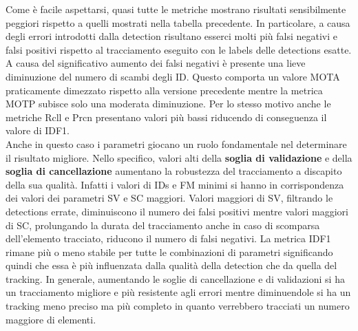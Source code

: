 Come è facile aspettarsi, quasi tutte le metriche mostrano risultati sensibilmente peggiori rispetto a quelli mostrati nella tabella precedente. In particolare, a causa degli errori introdotti dalla detection risultano esserci molti più falsi negativi e falsi positivi rispetto al tracciamento eseguito con le labels delle detections esatte. A causa del significativo aumento dei falsi negativi è presente una lieve diminuzione del numero di scambi degli ID. Questo comporta un valore MOTA praticamente dimezzato rispetto alla versione precedente mentre la metrica MOTP subisce solo una moderata diminuzione. Per lo stesso motivo anche le metriche Rcll e Prcn presentano valori più bassi riducendo di conseguenza il valore di IDF1.\\
Anche in questo caso i parametri giocano un ruolo fondamentale nel determinare il risultato migliore. Nello specifico, valori alti della \textbf{soglia di validazione} e della \textbf{soglia di cancellazione} aumentano la robustezza del tracciamento a discapito della sua qualità. Infatti i valori di IDs e FM minimi si hanno in corrispondenza dei valori dei parametri SV e SC maggiori. Valori maggiori di SV, filtrando le detections errate, diminuiscono il numero dei falsi positivi mentre valori maggiori di SC, prolungando la durata del tracciamento anche in caso di scomparsa dell'elemento tracciato, riducono il numero di falsi negativi. La metrica IDF1 rimane più o meno stabile per tutte le combinazioni di parametri significando quindi che essa è più influenzata dalla qualità della detection che da quella del tracking. In generale, aumentando le soglie di cancellazione e di validazioni si ha un tracciamento migliore e più resistente agli errori mentre diminuendole si ha un tracking meno preciso ma più completo in quanto verrebbero tracciati un numero maggiore di elementi.